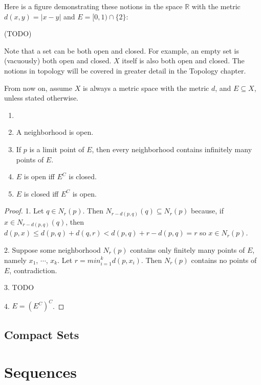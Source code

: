     Here is a figure demonstrating these notions in the space $\mathbb{R}$ with the metric $d(x,y) = |x-y|$ and $E = [0,1) \cap \{2\}$:
    
    (TODO)
    
    Note that a set can be both open and closed. For example, an empty set is (vacuously) both open and closed. $X$ itself is also both open and closed. The notions in topology will be covered in greater detail in the Topology chapter.
    
    From now on, assume $X$ is always a metric space with the metric $d$, and $E \subseteq X$, unless stated otherwise.
    
    \begin{prop} \label{prop_analysis_top} \begin{enumerate} \item[]
        \item A neighborhood is open.
        \item If $p$ is a limit point of $E$, then every neighborhood contains infinitely many points of $E$.
        \item $E$ is open iff $E^C$ is closed.
        \item $E$ is closed iff $E^C$ is open.
    \end{enumerate} \end{prop}
    
    \begin{proof}
    1. Let $q \in N_r(p)$. Then $N_{r-d(p,q)}(q) \subseteq N_r(p)$ because, if $x \in N_{r-d(p,q)}(q)$, then $d(p,x) \leq d(p,q)+d(q,r) < d(p,q)+r-d(p,q) = r$ so $x \in N_r(p)$.
    
    2. Suppose some neighborhood $N_r(p)$ contains only finitely many points of $E$, namely $x_1$, $\cdots$, $x_k$. Let $r=min_{i=1}^k d(p,x_i)$. Then $N_r(p)$ contains no points of $E$, contradiction.
    
    3. TODO
    
    4. $E = (E^C)^C$.
    \end{proof}
    
    \subsection{Compact Sets}
    
    \section{Sequences}
    
